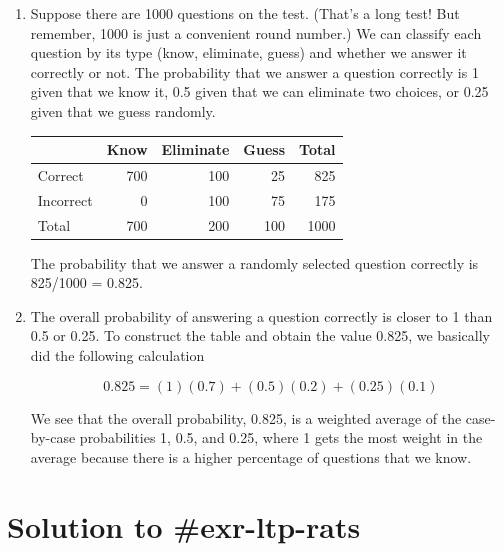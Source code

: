 \documentclass[
  letterpaper,
  DIV=11,
  numbers=noendperiod]{scrreprt}
\theoremstyle{plain}
\theoremstyle{definition}
\theoremstyle{definition}
\theoremstyle{definition}
\theoremstyle{remark}
\begin{document}
\begin{enumerate}
\def\labelenumi{\arabic{enumi}.}
\item
  Suppose there are 1000 questions on the test. (That's a long test! But
  remember, 1000 is just a convenient round number.) We can classify
  each question by its type (know, eliminate, guess) and whether we
  answer it correctly or not. The probability that we answer a question
  correctly is 1 given that we know it, 0.5 given that we can eliminate
  two choices, or 0.25 given that we guess randomly.

  \begin{longtable}[]{@{}lrrrr@{}}
  \toprule\noalign{}
  & Know & Eliminate & Guess & Total \\
  \midrule\noalign{}
  \endhead
  \bottomrule\noalign{}
  \endlastfoot
  Correct & 700 & 100 & 25 & 825 \\
  Incorrect & 0 & 100 & 75 & 175 \\
  Total & 700 & 200 & 100 & 1000 \\
  \end{longtable}

  The probability that we answer a randomly selected question correctly
  is 825/1000 = 0.825.
\item
  The overall probability of answering a question correctly is closer to
  1 than 0.5 or 0.25. To construct the table and obtain the value 0.825,
  we basically did the following calculation

  \[
   0.825 = (1)(0.7) + (0.5)(0.2) + (0.25)(0.1)
   \]

  We see that the overall probability, 0.825, is a weighted average of
  the case-by-case probabilities 1, 0.5, and 0.25, where 1 gets the most
  weight in the average because there is a higher percentage of
  questions that we know.
\end{enumerate}

\section{Solution to \#exr-ltp-rats}\label{solution-to-exr-ltp-rats}
\end{document}
